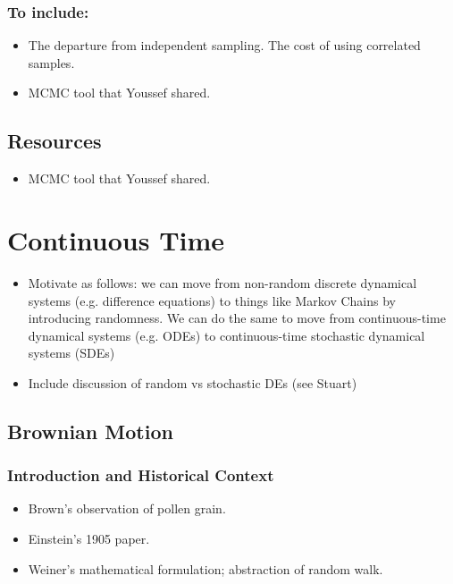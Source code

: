 \documentclass[12pt]{article}
\begin{document}
\subsubsection{To include:}
\begin{itemize}
\item The departure from independent sampling. The cost of using correlated samples. 
\item MCMC tool that Youssef shared. 
\end{itemize}

\subsection{Resources}
\begin{itemize}
\item MCMC tool that Youssef shared. 
\end{itemize}









\section{Continuous Time}
\begin{itemize}
\item Motivate as follows: we can move from non-random discrete dynamical systems (e.g. difference equations) to things like Markov Chains by introducing randomness. We can do the 
same to move from continuous-time dynamical systems (e.g. ODEs) to continuous-time stochastic dynamical systems (SDEs) 
\item Include discussion of random vs stochastic DEs (see Stuart)
\end{itemize}

\subsection{Brownian Motion}

\subsubsection{Introduction and Historical Context}
\begin{itemize}
\item Brown's observation of pollen grain. 
\item Einstein's 1905 paper. 
\item Weiner's mathematical formulation; abstraction of random walk. 
\end{itemize}
\end{document}
